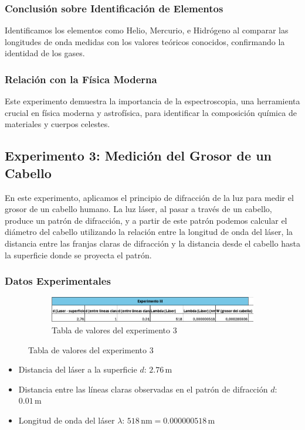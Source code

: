 \subsubsection{Conclusión sobre Identificación de Elementos}
Identificamos los elementos como Helio, Mercurio, e Hidrógeno al comparar las longitudes de onda medidas con los valores teóricos conocidos, confirmando la identidad de los gases.

\subsubsection{Relación con la Física Moderna}
Este experimento demuestra la importancia de la espectroscopia, una herramienta crucial en física moderna y astrofísica, para identificar la composición química de materiales y cuerpos celestes.

\subsection{Experimento 3: Medición del Grosor de un Cabello}
En este experimento, aplicamos el principio de difracción de la luz para medir el grosor de un cabello humano. La luz láser, al pasar a través de un cabello, produce un patrón de difracción, y a partir de este patrón podemos calcular el diámetro del cabello utilizando la relación entre la longitud de onda del láser, la distancia entre las franjas claras de difracción y la distancia desde el cabello hasta la superficie donde se proyecta el patrón.

\subsubsection{Datos Experimentales}

\begin{figure}[H]
  \centering
  \begin{subfigure}[b]{\textwidth}
      \centering
      \includegraphics[width=\textwidth]{Figures/1. Content/tabla-experimento-3.png}
      \caption{Tabla de valores del experimento 3}
      \label{fig: Tabla experimento 3}
  \end{subfigure}
  \hfill
\end{figure}

\begin{itemize}
    \item Distancia del láser a la superficie \(d\): \(2.76 \, \text{m}\)
    \item Distancia entre las líneas claras observadas en el patrón de difracción \(d\): \(0.01 \, \text{m}\)
    \item Longitud de onda del láser \(\lambda\): \(518 \, \text{nm} = 0.000000518 \, \text{m}\)
\end{itemize}

